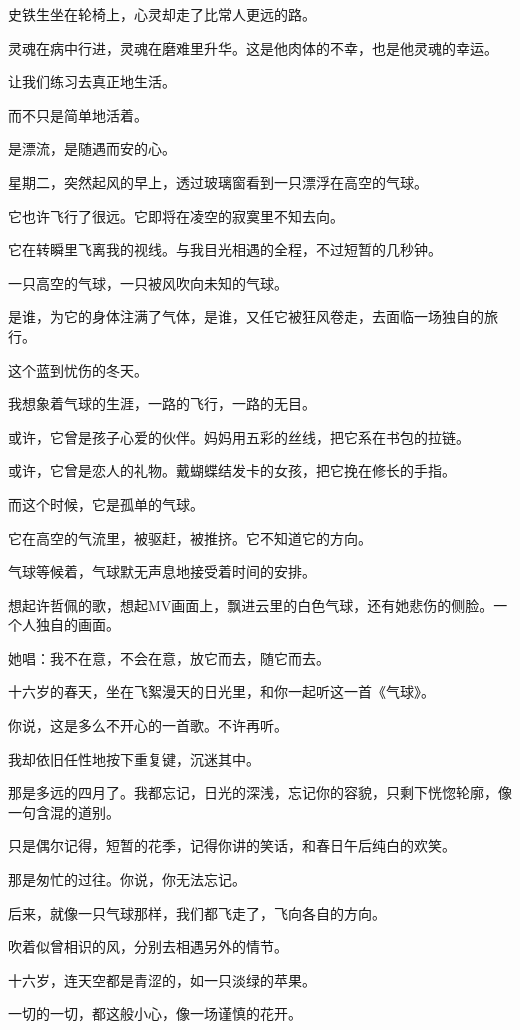 \documentclass[12pt,a4paper]{article}
\def\blankrev{\vspace{1ex}}									%
\begin{document}
		史铁生坐在轮椅上，心灵却走了比常人更远的路。\par
		灵魂在病中行进，灵魂在磨难里升华。这是他肉体的不幸，也是他灵魂的幸运。\par
		让我们练习去真正地生活。\par
		而不只是简单地活着。

	\endwriting



		是漂流，是随遇而安的心。

		\blankrev
		星期二，突然起风的早上，透过玻璃窗看到一只漂浮在高空的气球。\par
		它也许飞行了很远。它即将在凌空的寂寞里不知去向。\par
		它在转瞬里飞离我的视线。与我目光相遇的全程，不过短暂的几秒钟。\par
		一只高空的气球，一只被风吹向未知的气球。\par
		是谁，为它的身体注满了气体，是谁，又任它被狂风卷走，去面临一场独自的旅行。\par
		这个蓝到忧伤的冬天。\par
		我想象着气球的生涯，一路的飞行，一路的无目。\par
		或许，它曾是孩子心爱的伙伴。妈妈用五彩的丝线，把它系在书包的拉链。\par
		或许，它曾是恋人的礼物。戴蝴蝶结发卡的女孩，把它挽在修长的手指。\par
		而这个时候，它是孤单的气球。\par
		它在高空的气流里，被驱赶，被推挤。它不知道它的方向。\par
		气球等候着，气球默无声息地接受着时间的安排。

		\blankrev
		想起许哲佩的歌，想起MV画面上，飘进云里的白色气球，还有她悲伤的侧脸。一个人独自的画面。\par
		她唱：我不在意，不会在意，放它而去，随它而去。\par
		十六岁的春天，坐在飞絮漫天的日光里，和你一起听这一首《气球》。\par
		你说，这是多么不开心的一首歌。不许再听。\par
		我却依旧任性地按下重复键，沉迷其中。\par
		那是多远的四月了。我都忘记，日光的深浅，忘记你的容貌，只剩下恍惚轮廓，像一句含混的道别。\par
		只是偶尔记得，短暂的花季，记得你讲的笑话，和春日午后纯白的欢笑。\par
		那是匆忙的过往。你说，你无法忘记。\par
		后来，就像一只气球那样，我们都飞走了，飞向各自的方向。\par
		吹着似曾相识的风，分别去相遇另外的情节。\par
		十六岁，连天空都是青涩的，如一只淡绿的苹果。\par
		一切的一切，都这般小心，像一场谨慎的花开。
\end{document}
